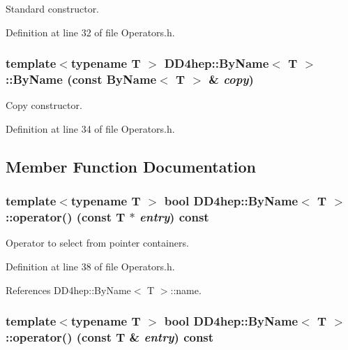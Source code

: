 Standard constructor. 

Definition at line 32 of file Operators.h.\hypertarget{class_d_d4hep_1_1_by_name_a09dee9528eddd3d93d3ab985717dc809}{
\subsubsection[{ByName}]{\setlength{\rightskip}{0pt plus 5cm}template$<$typename T $>$ {\bf DD4hep::ByName}$<$ {\bf T} $>$::{\bf ByName} (const {\bf ByName}$<$ {\bf T} $>$ \& {\em copy})}}
\label{class_d_d4hep_1_1_by_name_a09dee9528eddd3d93d3ab985717dc809}


Copy constructor. 

Definition at line 34 of file Operators.h.

\subsection{Member Function Documentation}
\hypertarget{class_d_d4hep_1_1_by_name_aa9b38bd7564f652afd15815c227bd04f}{
\subsubsection[{operator()}]{\setlength{\rightskip}{0pt plus 5cm}template$<$typename T $>$ bool {\bf DD4hep::ByName}$<$ {\bf T} $>$::operator() (const {\bf T} $\ast$ {\em entry}) const}}
\label{class_d_d4hep_1_1_by_name_aa9b38bd7564f652afd15815c227bd04f}


Operator to select from pointer containers. 

Definition at line 38 of file Operators.h.

References DD4hep::ByName$<$ T $>$::name.\hypertarget{class_d_d4hep_1_1_by_name_a63a9653ea07e3a2818c0e77bb2d2914d}{
\subsubsection[{operator()}]{\setlength{\rightskip}{0pt plus 5cm}template$<$typename T $>$ bool {\bf DD4hep::ByName}$<$ {\bf T} $>$::operator() (const {\bf T} \& {\em entry}) const}}
\label{class_d_d4hep_1_1_by_name_a63a9653ea07e3a2818c0e77bb2d2914d}


